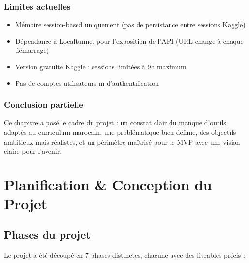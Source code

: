 \documentclass[12pt,a4paper]{report}
\begin{document}
\subsection{Limites actuelles}
\begin{itemize}
    \item Mémoire session-based uniquement (pas de persistance entre sessions Kaggle)
    \item Dépendance à Localtunnel pour l'exposition de l'API (URL change à chaque démarrage)
    \item Version gratuite Kaggle : sessions limitées à 9h maximum
    \item Pas de comptes utilisateurs ni d'authentification
\end{itemize}

\subsection*{Conclusion partielle}
Ce chapitre a posé le cadre du projet : un constat clair du manque d'outils adaptés au curriculum marocain, une problématique bien définie, des objectifs ambitieux mais réalistes, et un périmètre maîtrisé pour le MVP avec une vision claire pour l'avenir.

\chapter{Planification \& Conception du Projet}

\section{Phases du projet}
Le projet a été découpé en 7 phases distinctes, chacune avec des livrables précis :
\end{document}
